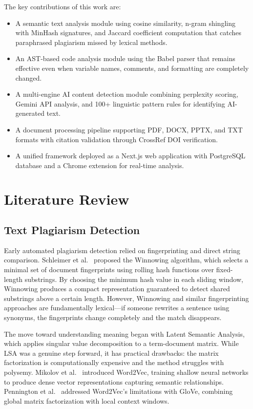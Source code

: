 \documentclass[10pt,twocolumn]{article}
\begin{document}
The key contributions of this work are:

\begin{itemize}
\item A semantic text analysis module using cosine similarity, n-gram shingling with MinHash signatures, and Jaccard coefficient computation that catches paraphrased plagiarism missed by lexical methods.
\item An AST-based code analysis module using the Babel parser that remains effective even when variable names, comments, and formatting are completely changed.
\item A multi-engine AI content detection module combining perplexity scoring, Gemini API analysis, and 100+ linguistic pattern rules for identifying AI-generated text.
\item A document processing pipeline supporting PDF, DOCX, PPTX, and TXT formats with citation validation through CrossRef DOI verification.
\item A unified framework deployed as a Next.js web application with PostgreSQL database and a Chrome extension for real-time analysis.
\end{itemize}

\section{Literature Review}

\subsection{Text Plagiarism Detection}

Early automated plagiarism detection relied on fingerprinting and direct string comparison. Schleimer et al.~\cite{schleimer2003} proposed the Winnowing algorithm, which selects a minimal set of document fingerprints using rolling hash functions over fixed-length substrings. By choosing the minimum hash value in each sliding window, Winnowing produces a compact representation guaranteed to detect shared substrings above a certain length. However, Winnowing and similar fingerprinting approaches are fundamentally lexical---if someone rewrites a sentence using synonyms, the fingerprints change completely and the match disappears.

The move toward understanding meaning began with Latent Semantic Analysis, which applies singular value decomposition to a term-document matrix. While LSA was a genuine step forward, it has practical drawbacks: the matrix factorization is computationally expensive and the method struggles with polysemy. Mikolov et al.~\cite{mikolov2013} introduced Word2Vec, training shallow neural networks to produce dense vector representations capturing semantic relationships. Pennington et al.~\cite{pennington2014} addressed Word2Vec's limitations with GloVe, combining global matrix factorization with local context windows.
\end{document}
